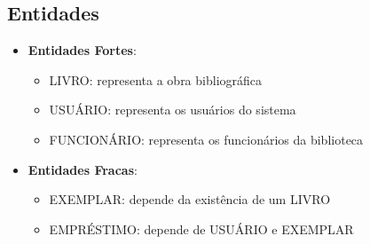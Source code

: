 \documentclass[12pt,a4paper]{article}
\begin{document}
\subsection{Entidades}
\begin{tcolorbox}[title=Identificação das Entidades]
\begin{itemize}
    \item \textbf{Entidades Fortes}:
    \begin{itemize}
        \item LIVRO: representa a obra bibliográfica
        \item USUÁRIO: representa os usuários do sistema
        \item FUNCIONÁRIO: representa os funcionários da biblioteca
    \end{itemize}
    \item \textbf{Entidades Fracas}:
    \begin{itemize}
        \item EXEMPLAR: depende da existência de um LIVRO
        \item EMPRÉSTIMO: depende de USUÁRIO e EXEMPLAR
    \end{itemize}
\end{itemize}
\end{tcolorbox}
\end{document}
